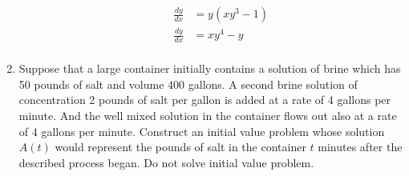 \documentclass[12pt]{report}
\begin{document}
\begin{enumerate}[label=\arabic*.]
\begin{enumerate}[label=(\roman*)]
{\begin{equation*}
		\begin{aligned}
			\frac{dy}{dx} &= y(xy^{3} - 1)\\
			\frac{dy}{dx} &= xy^{4} - y\\
		\end{aligned}
		\end{equation*}}
	\end{enumerate}
	\item Suppose that a large container initially contains a solution of brine which has 50 pounds of salt and volume 400 gallons. A second brine solution of concentration 2 pounds of salt per gallon is added at a rate of 4 gallons per minute. And the well mixed solution in the container flows out also at a rate of 4 gallons per minute. Construct an initial value problem whose solution $A(t)$ would represent the pounds of salt in the container $t$ minutes after the described process began. Do not solve initial value problem.
\end{enumerate}
\end{document}
